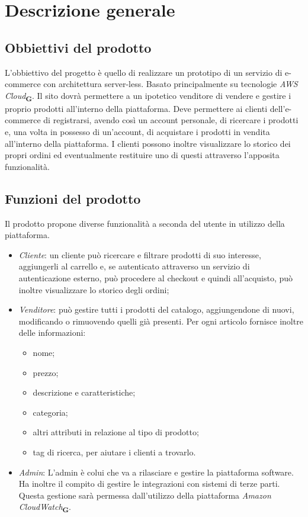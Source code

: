 \section{Descrizione generale}
\subsection{Obbiettivi del prodotto}
L'obbiettivo del progetto è quello di realizzare un prototipo di un servizio di e-commerce con architettura server-less. Basato principalmente su tecnologie \textit{AWS Cloud}\textsubscript{\textbf{G}}. Il sito dovrà permettere a un ipotetico venditore di vendere e gestire i proprio prodotti all'interno della piattaforma. Deve permettere ai clienti dell'e-commerce di registrarsi, avendo così un account personale, di ricercare i prodotti e, una volta in possesso di un'account, di acquistare i prodotti in vendita all'interno della piattaforma. I clienti possono inoltre visualizzare lo storico dei propri ordini ed eventualmente restituire uno di questi attraverso l'apposita funzionalità.
\subsection{Funzioni del prodotto}
Il prodotto propone diverse funzionalità a seconda del utente in utilizzo della piattaforma.
\begin{itemize}
    \item \textit{Cliente}: un cliente può ricercare e filtrare prodotti di suo interesse, aggiungerli al carrello e, se autenticato attraverso un servizio di autenticazione esterno, può procedere al checkout e quindi all'acquisto, può inoltre visualizzare lo storico degli ordini;
    \item \textit{Venditore}: può gestire tutti i prodotti del catalogo, aggiungendone di nuovi, modificando o rimuovendo quelli già presenti. Per ogni articolo fornisce inoltre delle  informazioni:
    \begin{itemize}
        \item nome;
        \item prezzo;
        \item descrizione e caratteristiche;
        \item categoria;
        \item altri attributi in relazione al tipo di prodotto;
        \item tag di ricerca, per aiutare i clienti a trovarlo.
    \end{itemize}
    \item \textit{Admin}: L'admin è colui che va a rilasciare e gestire la piattaforma software. Ha inoltre il compito di gestire le integrazioni con sistemi di terze parti. Questa gestione sarà permessa dall'utilizzo della piattaforma \textit{Amazon CloudWatch}\textsubscript{\textbf{G}}.
\end{itemize}
